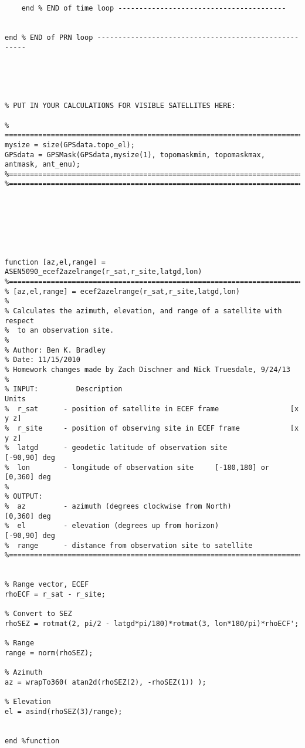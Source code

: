 \documentclass[12pt,a4paper,oneside]{article}
\begin{document}
\begin{appendix}
\begin{lstlisting}
    
    end % END of time loop ----------------------------------------
    
     
end % END of PRN loop -----------------------------------------------------





% PUT IN YOUR CALCULATIONS FOR VISIBLE SATELLITES HERE:

% =========================================================================
mysize = size(GPSdata.topo_el);
GPSdata = GPSMask(GPSdata,mysize(1), topomaskmin, topomaskmax, antmask, ant_enu);
%==========================================================================
%==========================================================================







function [az,el,range] = ASEN5090_ecef2azelrange(r_sat,r_site,latgd,lon)
%==========================================================================
% [az,el,range] = ecef2azelrange(r_sat,r_site,latgd,lon)
%
% Calculates the azimuth, elevation, and range of a satellite with respect
%  to an observation site.
%
% Author: Ben K. Bradley
% Date: 11/15/2010
% Homework changes made by Zach Dischner and Nick Truesdale, 9/24/13
%
% INPUT:         Description                                         Units
%  r_sat      - position of satellite in ECEF frame                 [x y z]
%  r_site     - position of observing site in ECEF frame            [x y z]
%  latgd      - geodetic latitude of observation site          [-90,90] deg
%  lon        - longitude of observation site     [-180,180] or [0,360] deg
%
% OUTPUT:
%  az         - azimuth (degrees clockwise from North)          [0,360] deg
%  el         - elevation (degrees up from horizon)            [-90,90] deg
%  range      - distance from observation site to satellite
%==========================================================================


% Range vector, ECEF
rhoECF = r_sat - r_site;

% Convert to SEZ
rhoSEZ = rotmat(2, pi/2 - latgd*pi/180)*rotmat(3, lon*180/pi)*rhoECF';

% Range
range = norm(rhoSEZ);

% Azimuth
az = wrapTo360( atan2d(rhoSEZ(2), -rhoSEZ(1)) );

% Elevation
el = asind(rhoSEZ(3)/range);


end %function


\end{lstlisting}
\end{appendix}
\end{document}

